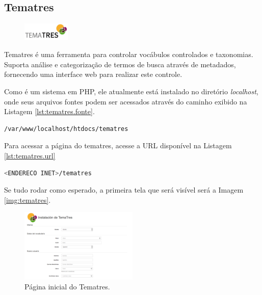 \subsection{Tematres}\label{tematres}

\begin{figure} %
    \centering
    \includegraphics[width=0.2\textwidth]{../images/tematres.jpg}
\end{figure}

Tematres é uma ferramenta para controlar vocábulos controlados e taxonomias. Suporta análise e categorização de termos de busca através de metadados, fornecendo uma interface web para realizar este controle.

Como é um sistema em PHP, ele atualmente está instalado no diretório \textit{localhost}, onde seus arquivos fontes podem ser acessados através do caminho exibido na Listagem \ref{lst:tematres.fonte}.
\begin{lstlisting}[language=bash, label=lst:tematres.fonte, caption=Arquivos fontes do tematres.]
    /var/www/localhost/htdocs/tematres
\end{lstlisting}

Para acessar a página do tematres, acesse a URL disponível na Listagem \ref{lst:tematres.url}
\begin{lstlisting}[language=bash, label=lst:tematres.url, caption=Acessando o Tematres.]
    <ENDERECO INET>/tematres
\end{lstlisting}

Se tudo rodar como esperado, a primeira tela que será visível será a Imagem \ref{img:tematres}.

\begin{figure}[H]
    \centering
    \includegraphics[width=0.5\textwidth]{../images/tematres2.png}
    \caption{Página inicial do Tematres.}
    \label{fig:dspace}
\end{figure}
